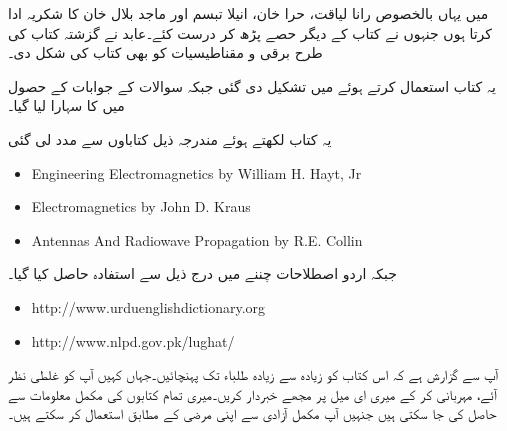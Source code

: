 میں یہاں بالخصوص رانا لیاقت، حرا خان، انیلا تبسم اور ماجد بلال خان کا شکریہ ادا کرتا ہوں جنہوں نے کتاب کے دیگر حصے پڑھ کر درست کئے۔عابد نے گزشتہ کتاب کی طرح برقی و مقناطیسیات کو بھی کتاب کی شکل دی۔

یہ کتاب  استعمال کرتے ہوئے  میں تشکیل دی گئی جبکہ سوالات کے جوابات کے حصول میں  کا سہارا لیا گیا۔

یہ کتاب لکھتے ہوئے مندرجہ ذیل کتاباوں سے مدد لی گئی
{
\begin{otherlanguage}{english}
\begin{itemize}
\item
Engineering Electromagnetics by William H. Hayt, Jr
\item
Electromagnetics by John D. Kraus
\item
Antennas And Radiowave Propagation by R.E. Collin
\end{itemize}
\end{otherlanguage}
}
جبکہ اردو اصطلاحات چننے میں درج ذیل سے استفادہ حاصل کیا گیا۔
{
\begin{otherlanguage}{english}
\begin{itemize}
\item
http://www.urduenglishdictionary.org
\item
http://www.nlpd.gov.pk/lughat/
\end{itemize}
\end{otherlanguage}
}
آپ سے گزارش ہے کہ اس کتاب کو زیادہ سے زیادہ طلباء تک پہنچائیں۔جہاں کہیں آپ کو غلطی نظر آئے، مہربانی کر کے میری ای میل پر مجھے خبردار کریں۔میری تمام کتابوں کی مکمل  معلومات  سے حاصل کی جا سکتی ہیں جنہیں آپ مکمل آزادی سے اپنی مرضی کے مطابق استعمال کر سکتے ہیں۔
\vspace{5mm}

{}


